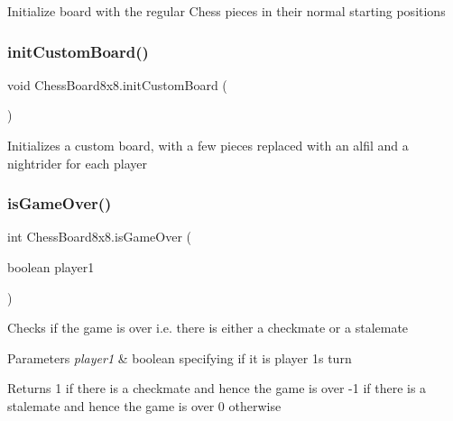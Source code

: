 Initialize board with the regular Chess pieces in their normal starting positions \mbox{\label{class_chess_board8x8_a1014b40768bc649f2056061b51af8dcf}} 
\subsubsection{\texorpdfstring{init\+Custom\+Board()}{initCustomBoard()}}
{\footnotesize\ttfamily void Chess\+Board8x8.\+init\+Custom\+Board (\begin{DoxyParamCaption}{ }\end{DoxyParamCaption})}

Initializes a custom board, with a few pieces replaced with an alfil and a nightrider for each player \mbox{\label{class_chess_board8x8_a5ea849ab3a349ce06edba6b6b7142118}} 
\subsubsection{\texorpdfstring{is\+Game\+Over()}{isGameOver()}}
{\footnotesize\ttfamily int Chess\+Board8x8.\+is\+Game\+Over (\begin{DoxyParamCaption}\item[{boolean}]{player1 }\end{DoxyParamCaption})}

Checks if the game is over i.\+e. there is either a checkmate or a stalemate 
\begin{DoxyParams}{Parameters}
{\em player1} & boolean specifying if it is player 1\textquotesingle{}s turn \\
\hline
\end{DoxyParams}
\begin{DoxyReturn}{Returns}
1 if there is a checkmate and hence the game is over -\/1 if there is a stalemate and hence the game is over 0 otherwise 
\end{DoxyReturn}
\mbox{\label{class_chess_board8x8_a195cc32e8b1f59447d0e1125da727f31}} 
